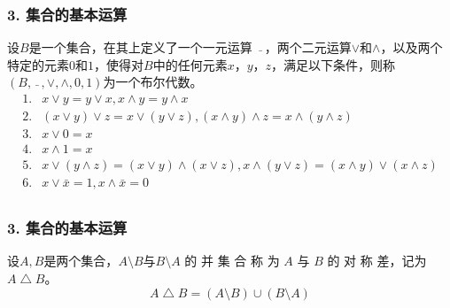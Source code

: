 \documentclass{beamer}
\begin{document}
\begin{CJK*}{UTF8}{gbsn}
\begin{frame}
\end{frame}
\begin{frame}
  \frametitle{3. 集合的基本运算}
  \begin{Def}
    设$B$是一个集合，在其上定义了一个一元运算 $\ \bar{}\ $，两个二元运算$\lor$和$\land$，以及两个特定的元素$0$和$1$，使得对$B$中的任何元素$x$，$y$，$z$，满足以下条件，则称$(B, \ \bar{}\ , \lor, \land, 0, 1)$为一个\alert{布尔代数}。
    \begin{align*}
      1. &x \lor y = y \lor x, x \land y = y \land x\\
      2. &(x \lor y) \lor z = x \lor (y \lor z), (x \land y) \land z = x \land (y \land z) \\
      3. &x \lor 0 = x \\
      4. &x \land 1 = x \\
      5.&x \lor (y \land z) = (x \lor y) \land (x \lor z), x \land (y \lor z) = (x \land y) \lor (x \land z)\\
      6. &x \lor \bar{x} = 1, x \land \bar{x} = 0\\
    \end{align*}
  \end{Def}
\end{frame}
\begin{frame}
  \frametitle{3. 集合的基本运算}
\begin{minipage}{0.69\linewidth}
  \begin{Def}
    设$A,B$是两个集合，$A\setminus B$与$B\setminus A$ 的 并 集 合 称 为 $A$ 与 $B$ 的 \alert{对 称 差}，记为$A \bigtriangleup B$。
    \begin{equation*}
      A\bigtriangleup B = (A \setminus B) \cup (B \setminus A)
    \end{equation*}
  \end{Def}\pause
\end{minipage}
\begin{minipage}{0.29\linewidth}
\end{minipage}
\end{frame}
\end{CJK*}
\end{document}
